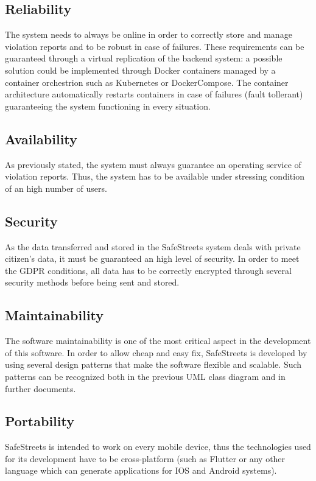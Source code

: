 \subsection{Reliability}
The system needs to always be online in order to correctly store and 
manage violation reports and to be robust in case of failures. These 
requirements can be guaranteed through a virtual replication of the 
backend system: a possible solution
could be implemented through Docker containers managed by a container
orchestrion such as Kubernetes or DockerCompose. The container architecture
automatically restarts containers in case of failures (fault tollerant)
guaranteeing the system functioning in every situation.
\subsection{Availability}
As previously stated, the system must always guarantee an operating service of
violation reports. Thus, the system has to be available 
under stressing condition of an high number of users.
\subsection{Security}
As the data transferred and stored in the SafeStreets system deals with
private citizen's data, it must be guaranteed an high level of security.
In order to meet the GDPR conditions, all data has to be correctly 
encrypted through several security methods before being sent and stored.
\subsection{Maintainability}
The software maintainability is one of the most critical aspect in the
development of this software. In order to allow cheap and easy fix, SafeStreets
is developed by using several design patterns that make the software
flexible and scalable. Such patterns can be recognized both in the previous
UML class diagram and in further documents.
\subsection{Portability}
SafeStreets is intended to work on every mobile device, thus the technologies
used for its development have to be cross-platform (such as Flutter or any other
language which can generate applications for IOS and Android systems).